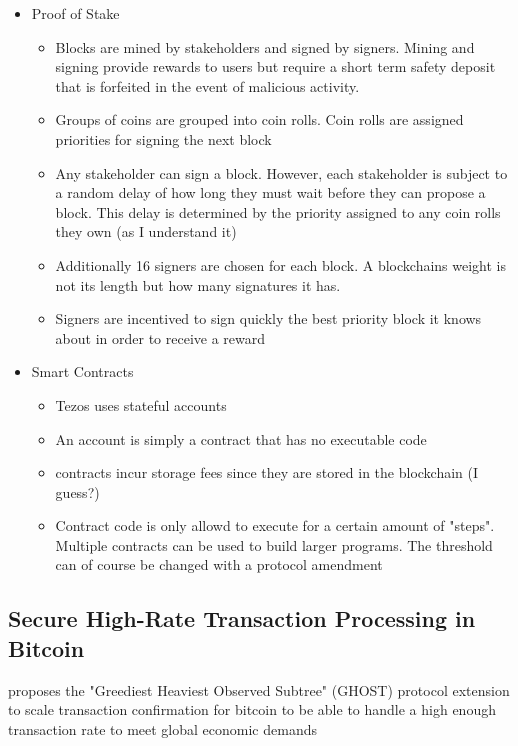 \documentclass[a4paper]{article}
\begin{document}
\begin{itemize}
\begin{itemize}
\item Proof of Stake
\begin{itemize}
\item Blocks are mined by stakeholders and signed by signers. Mining and signing provide rewards to users but require a short term safety deposit that is forfeited in the event of malicious activity.
\item Groups of coins are grouped into coin rolls. Coin rolls are assigned priorities for signing the next block
\item Any stakeholder can sign a block. However, each stakeholder is subject to a random delay of how long they must wait before they can propose a block. This delay is determined by the priority assigned to any coin rolls they own (as I understand it)
\item Additionally 16 signers are chosen for each block. A blockchains weight is not its length but how many signatures it has.
\item Signers are incentived to sign quickly the best priority block it knows about in order to receive a reward

\end{itemize}

\item Smart Contracts
\begin{itemize}
\item Tezos uses stateful accounts
\item An account is simply a contract that has no executable code
\item contracts incur storage fees since they are stored in the blockchain (I guess?)
\item Contract code is only allowd to execute for a certain amount of "steps". Multiple contracts can be used to build larger programs. The threshold can of course be changed with a protocol amendment
\end{itemize}
\end{itemize}

\end{itemize}

\subsection{Secure High-Rate Transaction Processing in Bitcoin}
proposes the "Greediest Heaviest Observed Subtree" (GHOST) protocol extension to scale transaction confirmation for bitcoin to be able to handle a high enough transaction rate to meet global economic demands
\end{document}
